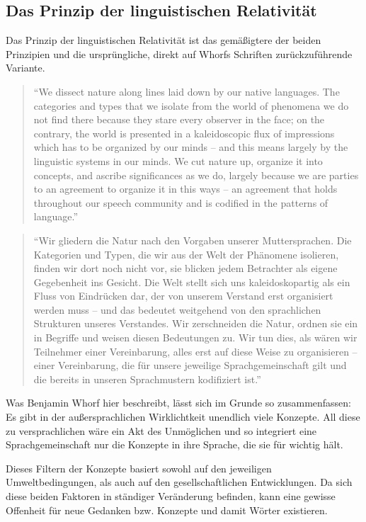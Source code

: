 \documentclass[12pt]{scrreprt}
\begin{document}
		\subsection{Das Prinzip der linguistischen Relativität}
		\label{sec:sawo_lingrelativ}
		Das Prinzip der linguistischen Relativität ist das gemäßigtere der beiden
		Prinzipien und die ursprüngliche, direkt auf Whorfs Schriften
		zurückzuführende Variante.
		\blockquote{
		\enquote{We dissect nature along lines laid down by our native languages. The
		categories and types that we isolate from the world of phenomena we do not
		find there because they stare every observer in the face; on the contrary,
		the world is presented in a kaleidoscopic flux of impressions which has to
		be organized by our minds – and this means largely by the linguistic systems
		in our minds. We cut nature up, organize it into concepts, and ascribe
		significances as we do, largely because we are parties to an agreement to
		organize it in this ways – an agreement that holds throughout our speech
		community and is codified in the patterns of language.}\autocite{article:Science_and_linguistics}
		}
		\blockquote{
		\enquote{Wir gliedern die Natur nach den Vorgaben unserer Muttersprachen. Die
		Kategorien und Typen, die wir aus der Welt der Phänomene isolieren, finden
		wir dort noch nicht vor, sie blicken jedem Betrachter als eigene Gegebenheit
		ins Gesicht. Die Welt stellt sich uns kaleidoskopartig als ein Fluss von
		Eindrücken dar, der von unserem Verstand erst organisiert werden muss – und
		das bedeutet weitgehend von den sprachlichen Strukturen unseres Verstandes.
		Wir zerschneiden die Natur, ordnen sie ein in Begriffe und weisen diesen
		Bedeutungen zu. Wir tun dies, als wären wir Teilnehmer einer Vereinbarung,
		alles erst auf diese Weise zu organisieren – einer Vereinbarung, die für
		unsere jeweilige Sprachgemeinschaft gilt und die bereits in unseren
		Sprachmustern kodifiziert ist.}\autocite{article:Science_and_linguistics}
		}
		Was Benjamin Whorf hier beschreibt, lässt sich im Grunde so zusammenfassen:
		\smallskip\newline
		Es gibt in der außersprachlichen Wirklichtkeit unendlich viele Konzepte. All
		diese zu versprachlichen wäre ein Akt des Unmöglichen und so integriert eine
		Sprachgemeinschaft nur die Konzepte in ihre Sprache, die sie für wichtig
		hält.

		Dieses Filtern der Konzepte basiert sowohl auf den jeweiligen
		Umweltbedingungen, als auch auf den gesellschaftlichen Entwicklungen.
		Da sich diese beiden Faktoren in ständiger Veränderung befinden, kann eine
		gewisse Offenheit für neue Gedanken bzw. Konzepte und damit Wörter
		existieren.\autocite{wiki:Sapir-Whorf-Hypothese}
\end{document}
